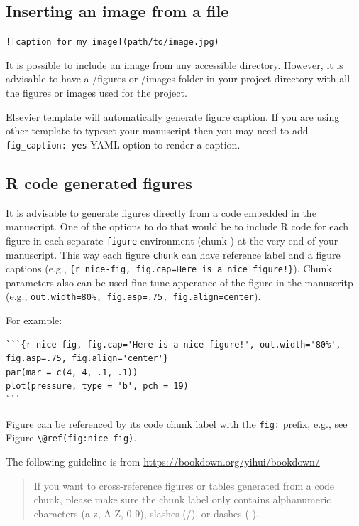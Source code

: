\documentclass[]{book}
\begin{document}
\subsection{Inserting an image from a
file}\label{inserting-an-image-from-a-file}

\texttt{!{[}caption\ for\ my\ image{]}(path/to/image.jpg)}

It is possible to include an image from any accessible directory.
However, it is advisable to have a /figures or /images folder in your
project directory with all the figures or images used for the project.

Elsevier template will automatically generate figure caption. If you are
using other template to typeset your manuscript then you may need to add
\texttt{fig\_caption:\ yes} YAML option to render a caption.

\subsection{R code generated figures}\label{r-code-generated-figures}

It is advisable to generate figures directly from a code embedded in the
manuscript. One of the options to do that would be to include R code for
each figure in each separate \texttt{figure} environment (chunk ) at the
very end of your manuscript. This way each figure \texttt{chunk} can
have reference label and a figure captions (e.g.,
\texttt{\{r\ nice-fig,\ fig.cap=\textquotesingle{}Here\ is\ a\ nice\ figure!\textquotesingle{}\}}).
Chunk parameters also can be used fine tune apperance of the figure in
the manuscritp (e.g.,
\texttt{out.width=\textquotesingle{}80\%\textquotesingle{},\ fig.asp=.75,\ fig.align=\textquotesingle{}center\textquotesingle{}}).

For example:

\begin{verbatim}
```{r nice-fig, fig.cap='Here is a nice figure!', out.width='80%',
fig.asp=.75, fig.align='center'}
par(mar = c(4, 4, .1, .1))
plot(pressure, type = 'b', pch = 19)
```
\end{verbatim}

Figure can be referenced by its code chunk label with the \texttt{fig:}
prefix, e.g., see Figure \texttt{\textbackslash{}@ref(fig:nice-fig)}.

The following guideline is from
\url{https://bookdown.org/yihui/bookdown/}

\begin{quote}
If you want to cross-reference figures or tables generated from a code
chunk, please make sure the chunk label only contains alphanumeric
characters (a-z, A-Z, 0-9), slashes (/), or dashes (-).
\end{quote}
\end{document}
